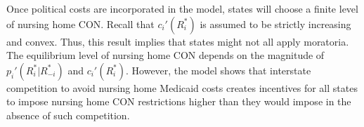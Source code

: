 \documentclass[../Main.tex]{subfiles}
\begin{document}
Once political costs are incorporated in the model, states will choose a finite level of nursing home CON. Recall that $c_i'(R_i^*)$ is assumed to be strictly increasing and convex. Thus, this result implies that states might not all apply moratoria. The equilibrium level of nursing home CON depends on the magnitude of $p_i'(R_i^*|R_{-i}^*)$ and $c_i'(R_i^*)$. However, the model shows that interstate competition to avoid nursing home Medicaid costs creates incentives for all states to impose nursing home CON restrictions higher than they would impose in the absence of such competition.
\end{document}

